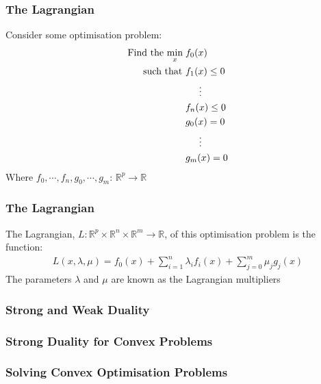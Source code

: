 \documentclass{beamer}
\def\rnum{\mathbb{R}}
\begin{document}
\begin{frame}
    \frametitle{The Lagrangian}
    Consider some optimisation problem:
    {\footnotesize
    \begin{align*}
        \text{Find the }\underset{x}{\text{min}}\; &f_{0}(x) \\
        \text{  such that }&f_{1}(x) \leq 0 \\
        & \hspace{5mm} \vdots \\
        &f_{n}(x) \leq 0 \\
        &g_{0}(x) = 0 \\
        &\hspace{5mm} \vdots \\
        &g_{m}(x) = 0
    \end{align*}}
    Where $f_0,\cdots, f_n, g_0, \cdots, g_m:\, \rnum^{p} \rightarrow \rnum$
\end{frame}

\begin{frame}
    \frametitle{The Lagrangian}
    The Lagrangian, $L : \rnum^{p} \times \rnum^{n} \times \rnum^{m} \rightarrow
    \rnum$, of this optimisation problem is the function:
    \begin{align*}
        L(x, \lambda, \mu) = f_{0}(x) + \sum\limits_{i=1}^{n}\lambda_{i} f_{i}(x) +
        \sum\limits_{j=0}^{m}\mu_{j}g_{j}(x)
    \end{align*}
    The parameters $\lambda$ and $\mu$ are known as the Lagrangian multipliers
\end{frame}



\begin{frame}
    \frametitle{Strong and Weak Duality}
\end{frame}

\begin{frame}
    \frametitle{Strong Duality for Convex Problems}
\end{frame}

\begin{frame}
    \frametitle{Solving Convex Optimisation Problems}
\end{frame}
\end{document}
